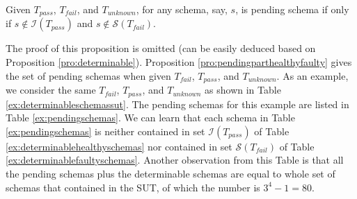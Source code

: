 
\begin{proposition}\label{pro:pendingparthealthyfaulty}
Given $T_{pass}$, $T_{fail}$, and $T_{unknown}$, for any schema, say, $s$, is pending schema if only if $s \not\in \mathcal{I}(T_{pass})$ and   $s \not\in \mathcal{S}(T_{fail})$.
\end{proposition}

The proof of this proposition is omitted (can be easily deduced based on Proposition \ref{pro:determinable}). Proposition \ref{pro:pendingparthealthyfaulty} gives the set of pending schemas when given $T_{fail}$, $T_{pass}$, and $T_{unknown}$.
As an example, we consider the same  $T_{fail}$, $T_{pass}$, and $T_{unknown}$ as shown in Table \ref{ex:determinableschemassut}. The pending schemas for this example are listed in Table \ref{ex:pendingschemas}. We can learn that each schema in Table \ref{ex:pendingschemas} is neither contained in set $\mathcal{I}(T_{pass})$ of Table \ref{ex:determinablehealthyschemas} nor contained in set $\mathcal{S}(T_{fail})$ of Table \ref{ex:determinablefaultyschemas}. Another observation from this Table is that all the pending schemas plus the determinable schemas are equal to whole set of  schemas that contained in the SUT, of which the number is $3^{4} - 1 = 80$.

